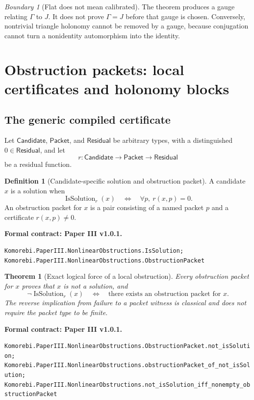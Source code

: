 \documentclass[11pt,a4paper]{article}
\newtheorem{theorem}{Theorem}[section]
\theoremstyle{plain}
\theoremstyle{definition}
\newtheorem{definition}[definition]{Definition}
\theoremstyle{remark}
\newtheorem{boundary}[boundary]{Boundary}
\newcommand{\leanname}[1]{\nolinkurl{#1}}
\newcommand{\statusleanthree}[1]{\par\smallskip\noindent\begin{minipage}{\linewidth}{\color{leanblue}\textbf{Formal contract: Paper III v1.0.1.}}\par\begingroup\small\raggedright\leanname{#1}\par\endgroup\end{minipage}\par\smallskip}
\begin{document}
\begin{boundary}[Flat does not mean calibrated]
The theorem produces a gauge relating $\Gamma$ to $J$.  It does not prove
$\Gamma=J$ before that gauge is chosen.  Conversely, nontrivial triangle
holonomy cannot be removed by a gauge, because conjugation cannot turn a
nonidentity automorphism into the identity.
\end{boundary}

\section{Obstruction packets: local certificates and holonomy blocks}
\label{sec:obstruction-packets}

\subsection{The generic compiled certificate}

Let $\mathsf{Candidate}$, $\mathsf{Packet}$, and $\mathsf{Residual}$ be
arbitrary types, with a distinguished
$0\in\mathsf{Residual}$, and let
\[
r:\mathsf{Candidate}\longrightarrow
\mathsf{Packet}\longrightarrow\mathsf{Residual}
\]
be a residual function.

\begin{definition}[Candidate-specific solution and obstruction packet]
\label{def:generic-obstruction}
A candidate $x$ is a solution when
\[
\operatorname{IsSolution}_r(x)
\quad\Longleftrightarrow\quad
\forall p,\ r(x,p)=0.
\]
An obstruction packet for $x$ is a pair consisting of a named packet $p$
and a certificate $r(x,p)\ne0$.
\end{definition}
\statusleanthree{Komorebi.PaperIII.NonlinearObstructions.IsSolution; Komorebi.PaperIII.NonlinearObstructions.ObstructionPacket}

\begin{theorem}[Exact logical force of a local obstruction]
\label{thm:generic-obstruction}
Every obstruction packet for $x$ proves that $x$ is not a solution, and
\[
\neg\operatorname{IsSolution}_r(x)
\quad\Longleftrightarrow\quad
\text{there exists an obstruction packet for }x.
\]
The reverse implication from failure to a packet witness is classical and
does not require the packet type to be finite.
\end{theorem}
\statusleanthree{Komorebi.PaperIII.NonlinearObstructions.ObstructionPacket.not_isSolution; Komorebi.PaperIII.NonlinearObstructions.obstructionPacket_of_not_isSolution; Komorebi.PaperIII.NonlinearObstructions.not_isSolution_iff_nonempty_obstructionPacket}
\end{document}
